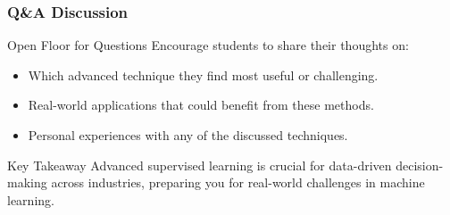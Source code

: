 \documentclass[aspectratio=169]{beamer}
\begin{document}
\begin{frame}[fragile]
    \frametitle{Q\&A Discussion}
    \begin{block}{Open Floor for Questions}
        Encourage students to share their thoughts on:
        \begin{itemize}
            \item Which advanced technique they find most useful or challenging.
            \item Real-world applications that could benefit from these methods.
            \item Personal experiences with any of the discussed techniques.
        \end{itemize}
    \end{block}

    \begin{block}{Key Takeaway}
        Advanced supervised learning is crucial for data-driven decision-making across industries, preparing you for real-world challenges in machine learning.
    \end{block}
\end{frame}
\end{document}
